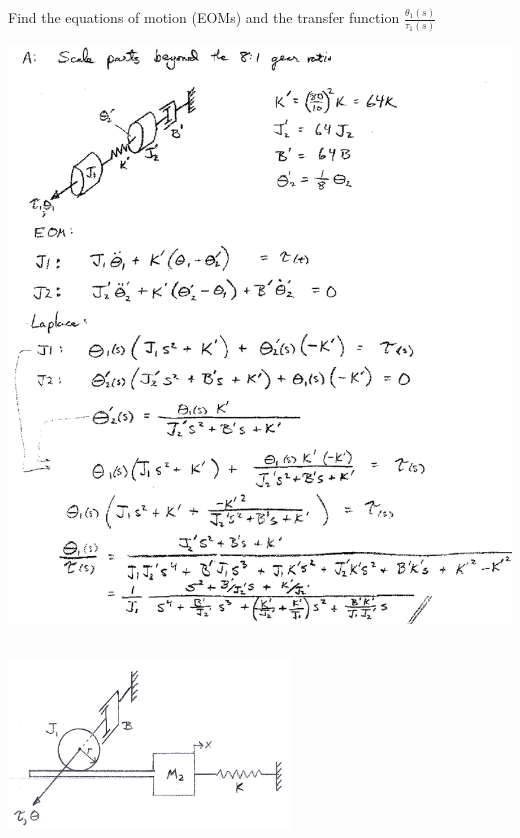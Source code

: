 \documentclass{article}	%
\begin{document}
Find the equations of motion (EOMs)  and the transfer function  $\frac{\theta_1(s)}{\tau_1(s)}$


\begin{solution}
\includegraphics[width=6.25in]{00946a.png}
\end{solution}



\subsection{}

\includegraphics[width=75mm]{00960aa.png}
\end{document}
